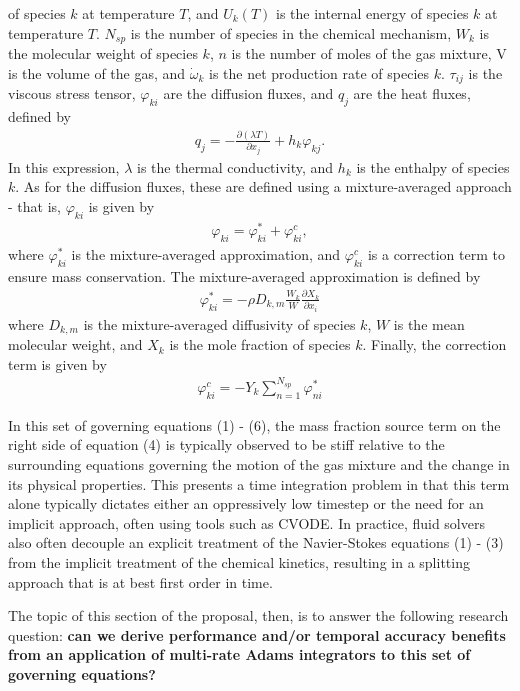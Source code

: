 of species $k$ at temperature $T$, and $U_{k}(T)$ is the internal energy of species $k$ at temperature $T$. $N_{sp}$ is the number
of species in the chemical mechanism, $W_{k}$ is the molecular weight of species $k$, $n$ is the number of moles of the gas mixture,
V is the volume of the gas, and $\dot{\omega}_{k}$ is the net production rate of species $k$. $\tau_{ij}$ is the viscous stress
tensor, $\varphi_{ki}$ are the diffusion fluxes, and $q_{j}$ are the heat fluxes, defined by
\begin{align}
q_{j} = - \frac{\partial (\lambda T)}{\partial x_{j}} + h_{k}\varphi_{kj}.
\end{align}
In this expression, $\lambda$ is the thermal conductivity, and $h_{k}$ is the enthalpy of species $k$.
As for the diffusion fluxes, these are defined using a mixture-averaged approach - that is, $\varphi_{ki}$
is given by
\begin{align}
\varphi_{ki} = \varphi_{ki}^{*} + \varphi_{ki}^{c},
\end{align}
where $\varphi_{ki}^{*}$ is the mixture-averaged approximation, and $\varphi_{ki}^{c}$
is a correction term to ensure mass conservation. The mixture-averaged approximation
is defined by
\begin{align}
\varphi_{ki}^{*} = -\rho D_{k,m}\frac{W_{k}}{W} \frac{\partial X_{k}}{\partial x_{i}}
\end{align}
where $D_{k,m}$ is the mixture-averaged diffusivity of species $k$, $W$ is the mean
molecular weight, and $X_{k}$ is the mole fraction of species $k$. Finally, the
correction term is given by
\begin{align}
\varphi_{ki}^{c} = -Y_{k} \sum_{n=1}^{N_{sp}} \varphi_{ni}^{*}
\end{align}

In this set of governing equations (1) - (6), the mass fraction source term
on the right side of equation (4) is typically observed to be stiff relative
to the surrounding equations governing the motion of the gas mixture and the change
in its physical properties. This presents a time integration problem in that this term
alone typically dictates either an oppressively low timestep or the need for
an implicit approach, often using tools such as CVODE. In practice, fluid solvers
also often decouple an explicit treatment of the Navier-Stokes equations (1) - (3)
from the implicit treatment of the chemical kinetics, resulting in a splitting
approach that is at best first order in time.

The topic of this section of the proposal, then, is to answer the following
research question: \textbf{can we derive performance and/or temporal accuracy benefits
from an application of multi-rate Adams integrators to this set of governing
equations?}


